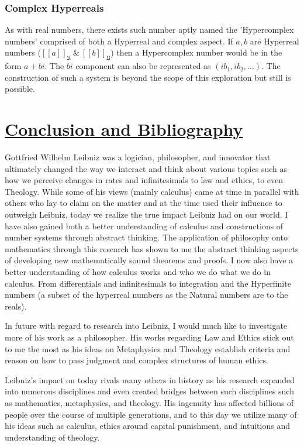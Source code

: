 \documentclass[12pt]{report}
\newcommand{\U}{\mathfrak{U}}
\begin{document}
\section*{Complex Hyperreals}
As with real numbers, there exists such number aptly named the 'Hypercomplex numbers' comprised of both a Hyperreal and complex aspect.
If $ a,b$ are Hyperreal numbers ($[[a]]_{\U} \  \& \  [[b]]_{\U}$) then a Hypercomplex number would be in the form $a+bi$.
The $bi $ component can also be represented as $(ib_1, ib_2,\ldots)$.
The construction of such a system is beyond the scope of this exploration but still is possible.


\part*{\underline{Conclusion and Bibliography}}
Gottfried Wilhelm Leibniz was a logician, philosopher, and innovator that ultimately changed the way we interact and think about various topics such as how we perceive changes in rates and infinitesimals to law and ethics, to even Theology.
While some of his views (mainly calculus) came at time in parallel with others who lay to claim on the matter and at the time used their influence to outweigh Leibniz, today we realize the true impact Leibniz had on our world.
I have also gained both a better understanding of calculus and constructions of number systems through abstract thinking.
The application of philosophy onto mathematics through this research has shown to me the abstract thinking aspects of developing new mathematically sound theorems and proofs.
I now also have a better understanding of how calculus works and who we do what we do in calculus.
From differentials and infinitesimals to integration and the Hyperfinite numbers (a subset of the hyperreal numbers as the Natural numbers are to the reals).
\par


In future with regard to research into Leibniz, I would much like to investigate more of his work as a philosopher.
His works regarding Law and Ethics stick out to me the most as his ideas on Metaphysics and Theology establish criteria and reason on how to pass judgment and complex structures of human ethics. \par
Leibniz's impact on today rivals many others in history as his research expanded into numerous disciplines and even created bridges between such disciplines such as mathematics, metaphysics, and theology.
His ingenuity has affected billions of people over the course of multiple generations, and to this day we utilize many of his ideas such as calculus, ethics around capital punishment, and intuitions and understanding of theology.\par \\
\end{document}

